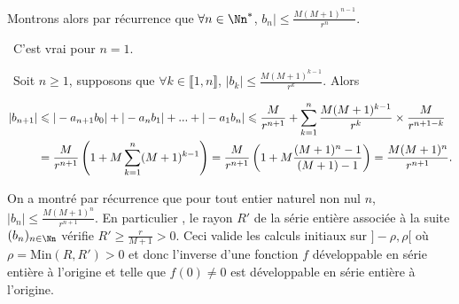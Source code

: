 {\begin{enumerate}
{Montrons alors par récurrence que $\forall n\in\Nn^*$, $b_n|\leqslant\frac{M(M+1)^{n-1}}{r^n}$.

\textbullet~C'est vrai pour $n=1$.

\textbullet~Soit $n\geqslant1$, supposons que $\forall k\in\llbracket1,n\rrbracket$, $|b_k|\leqslant\frac{M(M+1)^{k-1}}{r^k}$. Alors 

\begin{align*}\ensuremath
\left|b_{n+1}\right|&\leqslant|-a_{n+1}b_0| +|-a_nb_1| + ...+ |-a_1b_n|\leqslant\frac{M}{r^{n+1}}+\sum_{k=1}^{n}\frac{M(M+1)^{k-1}}{r^k}\times\frac{M}{r^{n+1-k}}\\
 &=\frac{M}{r^{n+1}}\left(1+ M\sum_{k=1}^{n}(M+1)^{k-1}\right)=\frac{M}{r^{n+1}}\left(1+ M\frac{(M+1)^n-1}{(M+1)-1}\right)=\frac{M(M+1)^n}{r^{n+1}}.
\end{align*}

On a montré par récurrence que pour tout entier naturel non nul $n$, $|b_n|\leqslant\frac{M(M+1)^n}{r^{n+1}}$. En particulier , le rayon $R'$ de la série entière associée à la suite $(b_n)_{n\in\Nn}$ vérifie $R'\geqslant\frac{r}{M+1}> 0$. Ceci valide les calculs initiaux sur $]-\rho,\rho[$ où $\rho=\text{Min}(R,R')>0$ et donc l'inverse d'une fonction $f$ développable en série entière à l'origine et telle que $f(0)\neq0$ est développable en série entière à l'origine.}
\end{enumerate}
}